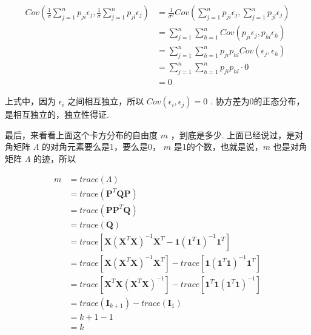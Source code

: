 \documentclass[UTF8]{ctexart}
\begin{document}
    \begin{equation}
    	\begin{aligned}
    	    Cov(\frac{1}{\sigma} \sum_{j=1}^{n}{p_{ji} \epsilon_{j}}, \frac{1}{\sigma} \sum_{j=1}^{n}{p_{jl} \epsilon_{j}}) & = \frac{1}{\sigma^2} Cov(\sum_{j=1}^{n}{p_{ji} \epsilon_{j}}, \sum_{j=1}^{n}{p_{jl} \epsilon_{j}}) \\
    	    & = \sum_{j=1}^{n} \sum_{h=1}^{n} Cov(p_{ji} \epsilon_{j}, p_{hl} \epsilon_{h}) \\
    	    & = \sum_{j=1}^{n} \sum_{h=1}^{n} p_{ji} p_{hl} Cov(\epsilon_{j}, \epsilon_{h}) \\
    	    & = \sum_{j=1}^{n} \sum_{h=1}^{n} p_{ji} p_{hl} \cdot 0 \\
    	    & = 0
    	\end{aligned}
    \end{equation}

    上式中，因为 $ \epsilon_i $ 之间相互独立，所以 $ Cov(\epsilon_i, \epsilon_j) = 0 $ . 协方差为0的正态分布，是相互独立的，独立性得证. 

    最后，来看看上面这个卡方分布的自由度 $ m $ ，到底是多少. 上面已经说过，是对角矩阵 $ \boldsymbol{\varLambda} $ 的对角元素要么是1，要么是0， $ m $  是1的个数，也就是说，$ m $ 也是对角矩阵 $ \boldsymbol{\varLambda} $ 的迹，所以
    
    \begin{equation}
        \begin{aligned}
            m & = trace(\boldsymbol{\varLambda}) \\
            & = trace(\boldsymbol{P}^T \boldsymbol{Q} \boldsymbol{P}) \\
            & = trace(\boldsymbol{P} \boldsymbol{P}^T \boldsymbol{Q}) \\
            & = trace(\boldsymbol{Q}) \\
            & = trace[\boldsymbol{X} (\boldsymbol{X}^T \boldsymbol{X})^{-1} \boldsymbol{X}^T - \boldsymbol{1}  (\boldsymbol{1}^T \boldsymbol{1})^{-1} \boldsymbol{1}^T] \\
            & = trace[\boldsymbol{X} (\boldsymbol{X}^T \boldsymbol{X})^{-1} \boldsymbol{X}^T] - trace[\boldsymbol{1}  (\boldsymbol{1}^T \boldsymbol{1})^{-1} \boldsymbol{1}^T] \\
            & = trace[\boldsymbol{X}^T \boldsymbol{X} (\boldsymbol{X}^T \boldsymbol{X})^{-1}] - trace[\boldsymbol{1}^T \boldsymbol{1} (\boldsymbol{1}^T \boldsymbol{1})^{-1}] \\
            & = trace(\boldsymbol{I}_{k + 1}) - trace(\boldsymbol{I}_1) \\
            & = k + 1 - 1 \\
            & = k
        \end{aligned}
    \end{equation}
\end{document}
